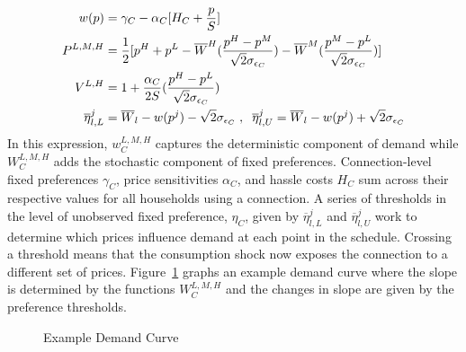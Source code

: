 \documentclass[12pt]{article}
\begin{document}
\begin{appendices}
\begin{align}
\begin{split}
w(p) &= \gamma_C - \alpha_C [ H_{C} + \frac{p}{S}]  \\
P^{L,M,H}  &= \dfrac{1}{2}[ p^{H} + p^{L} - \overline{W}^{H} (\frac{p^{H} - p^{M}}{\sqrt{2}{\sigma_{\epsilon_C}}})  - \overline{W}^{M} (\frac{p^{M} - p^{L}}{\sqrt{2}{\sigma_{\epsilon_C}}})  ] \\
V^{L,H} 	     	    &=   1 + \frac{\alpha_C}{2 S} ( \frac{p^{H} - p^{L}}{\sqrt{2}\sigma_{\epsilon_C}})   \\
\overline{\eta}^{j}_{l,L}   &= \overline{W}_l -  w(p^j)  - \sqrt{2} \sigma_{\epsilon_C} \hspace{.1cm},\hspace{.2cm} \overline{\eta}^{j}_{l,U}   = \overline{W}_l - w(p^j)  + \sqrt{2} \sigma_{\epsilon_C} \\
\end{split}
\end{align}
In this expression, $w^{L,M,H}_C$ captures the deterministic component of demand while $W^{L,M,H}_C$ adds the stochastic component of fixed preferences.  Connection-level fixed preferences $\gamma_C$, price sensitivities $\alpha_C$, and  hassle costs $H_C$ sum across their respective values for all households using a connection.  A series of thresholds in the level of unobserved fixed preference, $\eta_C$, given by $\overline{\eta}^{j}_{l,L}$ and $\overline{\eta}^{j}_{l,U}$ work to determine which prices influence demand at each point in the schedule.  Crossing a threshold means that the consumption shock now exposes the connection to a different set of prices.  Figure~\ref{figure:intuitivedemand} graphs an example demand curve where the slope is determined by the functions $W^{L,M,H}_C$ and the changes in slope are given by the preference thresholds.
\begin{figure}
\caption{Example Demand Curve}\label{figure:intuitivedemand}
\centering
{}
\end{figure}
\end{appendices}
\end{document}
